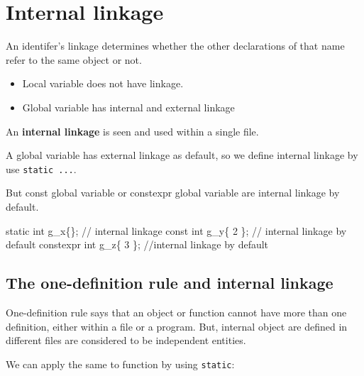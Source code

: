 \documentclass[
  letterpaper,
  DIV=11,
  numbers=noendperiod]{scrreprt}
\newenvironment{Shaded}{\begin{snugshade}}{\end{snugshade}}
\newcommand{\DecValTok}[1]{\textcolor[rgb]{0.68,0.00,0.00}{#1}}
\newcommand{\ErrorTok}[1]{\textcolor[rgb]{0.68,0.00,0.00}{#1}}
\newcommand{\NormalTok}[1]{\textcolor[rgb]{0.00,0.23,0.31}{#1}}
\newcommand{\SpecialCharTok}[1]{\textcolor[rgb]{0.37,0.37,0.37}{#1}}
\providecommand{\tightlist}{%
  \setlength{\itemsep}{0pt}\setlength{\parskip}{0pt}}\usepackage{longtable,booktabs,array}
\begin{document}
\hypertarget{internal-linkage}{%
\section{Internal linkage}\label{internal-linkage}}

An identifer's linkage determines whether the other declarations of that
name refer to the same object or not.

\begin{itemize}
\tightlist
\item
  Local variable does not have linkage.
\item
  Global variable has internal and external linkage
\end{itemize}

An \textbf{internal linkage} is seen and used within a single file.

A global variable has external linkage as default, so we define internal
linkage by use \texttt{static\ ...}.

But const global variable or constexpr global variable are internal
linkage by default.

\begin{Shaded}
\begin{Highlighting}[]
\NormalTok{static int g\_x\{\};   }\SpecialCharTok{/}\ErrorTok{/}\NormalTok{ internal linkage}
\NormalTok{const int g\_y\{ }\DecValTok{2}\NormalTok{ \}; }\SpecialCharTok{/}\ErrorTok{/}\NormalTok{ internal linkage by default}
\NormalTok{constexpr int g\_z\{ }\DecValTok{3}\NormalTok{ \}; }\SpecialCharTok{/}\ErrorTok{/}\NormalTok{internal linkage by default}
\end{Highlighting}
\end{Shaded}

\hypertarget{the-one-definition-rule-and-internal-linkage}{%
\subsection*{The one-definition rule and internal
linkage}\label{the-one-definition-rule-and-internal-linkage}}

One-definition rule says that an object or function cannot have more
than one definition, either within a file or a program. But, internal
object are defined in different files are considered to be independent
entities.

We can apply the same to function by using \texttt{static}:
\end{document}
